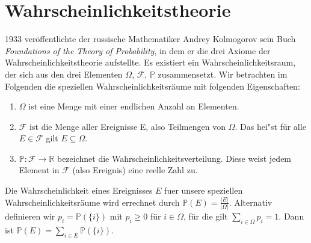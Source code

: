 \section{Wahrscheinlichkeitstheorie}


\vspace{15pt}


1933 ver\"offentlichte der russische Mathematiker Andrey Kolmogorov sein Buch \textit{Foundations of the Theory of Probability}, in dem er die drei Axiome der Wahrscheinlichkeitstheorie aufstellte. Es existiert ein Wahrscheinlichkeitsraum, der sich aus den drei Elementen $\Omega$, $\mathcal{F}$, $\mathbb{P}$ zusammensetzt. Wir betrachten im Folgenden die speziellen Wahrscheinlichkeitsr\"aume mit folgenden Eigenschaften:

\vspace{5pt}

\begin{enumerate}
	\item $\Omega$ ist eine Menge mit einer endlichen Anzahl an Elementen.
	\item $\mathcal{F}$ ist die Menge aller Ereignisse E, also Teilmengen von $\Omega$. Das hei"st f\"ur alle $E \in \mathcal{F}$ gilt $E \subseteq \Omega$.
	\item $\mathbb{P}: \mathcal{F} \rightarrow \mathbb{R}$ bezeichnet die Wahrscheinlichkeitsverteilung. Diese weist jedem Element in $\mathcal{F}$ (also Ereignis) eine reelle Zahl zu.  
	
	
\end{enumerate}

\vspace{10pt}


Die Wahrscheinlichkeit eines Ereignisses $E$ fuer unsere speziellen Wahrscheinlichkeitsr\"aume wird errechnet durch $ \mathbb{P}(E) = \frac{|E|}{|\Omega|}$.
Alternativ definieren wir $p_{i} = \mathbb{P} (\{i\})$ mit $p_{i} \geq 0$  
f\"ur $i \in \Omega$, f\"ur die gilt $\sum_{i\in \Omega} p_{i} =1$. Dann ist $\mathbb{P}(E) = \sum_{i\in E} \mathbb{P}(\{i\})$. 


